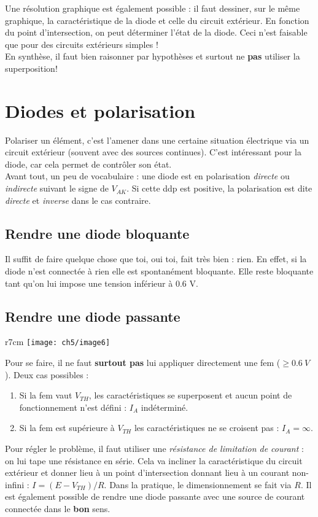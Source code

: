 		Une résolution graphique est également possible : il faut dessiner, sur le 
		même graphique, la caractéristique de la diode et celle du circuit extérieur. 
		En fonction du point d'intersection, on peut déterminer l'état de la diode. 
		Ceci n'est faisable que pour des circuits extérieurs simples !\\
		\danger En synthèse, il faut bien raisonner par hypothèses et surtout ne \textbf{pas} 
		utiliser la superposition!
			
			
	\section{Diodes et polarisation}
	Polariser un élément, c'est l'amener dans une certaine situation électrique via un 
	circuit extérieur (souvent avec des sources continues). C'est intéressant pour 
	la diode, car cela permet de contrôler son état.\\
	
	Avant tout, un peu de vocabulaire : une diode est en polarisation \textit{directe }
	ou \textit{indirecte} suivant le signe de $V_{AK}$. Si cette ddp est positive, la 
	polarisation est dite \textit{directe} et \textit{inverse} dans le cas contraire.
	
		\subsection{Rendre une diode bloquante}
		Il suffit de faire quelque chose que toi, oui toi, fait très bien : rien. En 
		effet, si la diode n'est connectée à rien elle est spontanément bloquante. 
		Elle reste bloquante tant qu'on lui impose une tension inférieur à 0.6 V.
			
		\subsection{Rendre une diode passante}
		\begin{wrapfigure}[8]{r}{7cm}
		\vspace{-0.5cm}
		\texttt{[image: ch5/image6]}
		\end{wrapfigure}
		Pour se faire, il ne faut \textbf{surtout pas} lui appliquer directement une 
		fem ($\geq 0.6\ V$). Deux cas possibles :
		\begin{enumerate}
		\item Si la fem vaut $V_{TH}$, les caractéristiques se superposent et aucun 
		point de fonctionnement n'est défini : $I_A$ indéterminé.
		\item Si la fem est supérieure à $V_{TH}$ les caractéristiques ne se croisent 
		pas : $I_A = \infty$.
		\end{enumerate}
		Pour régler le problème, il faut utiliser une \textit{résistance de limitation 
		de courant} : on lui tape une résistance en série. Cela va incliner la 
		caractéristique du circuit extérieur et donner lieu à un point d'intersection 
		donnant lieu à un courant non-infini : $I = (E-V_{TH})/R$. Dans la pratique, 
		le dimensionnement se fait via $R$. Il est également possible de rendre une 
		diode passante avec une source de courant connectée dans le \textbf{bon} sens.
		
